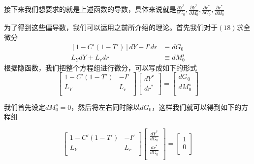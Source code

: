 \documentclass[UTF8,12pt]{ctexart}
\numberwithin{equation}{section} %
\numberwithin{figure}{section}
\numberwithin{table}{section}
\begin{document}
	接下来我们想要求的就是上述函数的导数，具体来说就是$\frac{\partial Y^*}{\partial G_0},\frac{\partial Y^*}{\partial M_0^s},\frac{\partial r^*}{\partial G_0},\frac{\partial r^*}{\partial M_0^s}$
	
	为了得到这些偏导数，我们可以运用之前所介绍的理论。首先我们对于$(18)$求全微分
	\begin{equation}
		\begin{aligned}
			[1-C'(1-T')]dY -I'dr & \equiv dG_0 \\
			L_YdY + L_rdr & \equiv dM_0^s 
		\end{aligned}
	\end{equation}
	根据隐函数，我们把整个方程组进行微分，可以写成如下的形式
	\begin{equation}
		\begin{bmatrix}
			1-C'(1-T') & -I'  \\
			L_Y & L_r  \\
		\end{bmatrix}	
		\begin{bmatrix}
			dY^* \\
			dr^* \\
		\end{bmatrix}
		=
		\begin{bmatrix}
			dG_0 \\
			dM^s_0 \\
		\end{bmatrix}
	\end{equation}
	
	我们首先设定$dM_0^s = 0$，然后将左右同时除以$dG_0$，这样我们就可以得到如下的方程组
	
	\begin{equation}
		\begin{bmatrix}
			1-C'(1-T') & -I'  \\
			L_Y & L_r  \\
		\end{bmatrix}		
		\begin{bmatrix}
			\frac{dY^*}{dG_0} \\
			\frac{dr^*}{dG_0} \\
		\end{bmatrix}
		=
		\begin{bmatrix}
			1 \\
			0 \\
		\end{bmatrix}
	\end{equation}
	
\end{document}
